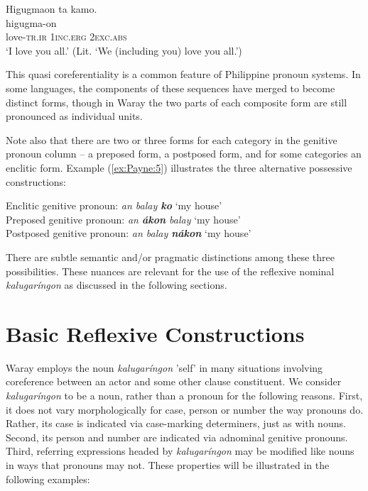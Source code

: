 \documentclass[output=paper]{langscibook}
\begin{document}
\ea\label{ex:Payne:4}
\glll
Higugmaon ta kamo.\\
higugma-on\\
love-\textsc{tr.ir} 1\textsc{inc.erg} 2\textsc{exc.abs}\\
\glt `I love you all.' (Lit. `We (including you) love you all.') 
\z

This quasi coreferentiality is a common feature of Philippine pronoun systems. In some languages, the components of these sequences have merged to become distinct forms, though in Waray the two parts of each composite form are still pronounced as individual units. 

Note also that there are two or three forms for each category in the genitive pronoun column – a preposed form, a postposed form, and for some categories an enclitic form. Example (\ref{ex:Payne:5}) illustrates the three alternative possessive constructions: 

\ea\label{ex:Payne:5}
\ea
 Enclitic genitive pronoun: \textit{an balay \textbf{ko}} `my house'\\
\ex  Preposed genitive pronoun:\textit{ an \textbf{ákon} balay} `my house'\\
\ex  Postposed genitive pronoun: \textit{an balay \textbf{nákon}} `my house'\\
\z
\z

There are subtle semantic and/or pragmatic distinctions among these three possibilities. These nuances are relevant for the use of the reflexive nominal \textit{kalugaríngon} as discussed in the following sections. 

\section{Basic Reflexive Constructions}\label{sec:Payne:4}

Waray employs the noun \textit{kalugaríngon} 'self' in many situations involving coreference between an actor and some other clause constituent. We consider \textit{kalugaríngon} to be a noun, rather than a pronoun for the following reasons. First, it does not vary morphologically for case, person or number the way pronouns do. Rather, its case is indicated via case-marking determiners, just as with nouns. Second, its person and number are indicated via adnominal genitive pronouns. Third, referring expressions headed by \textit{kalugaríngon} may be modified like nouns in ways that pronouns may not. These properties will be illustrated in the following examples:
\end{document}
